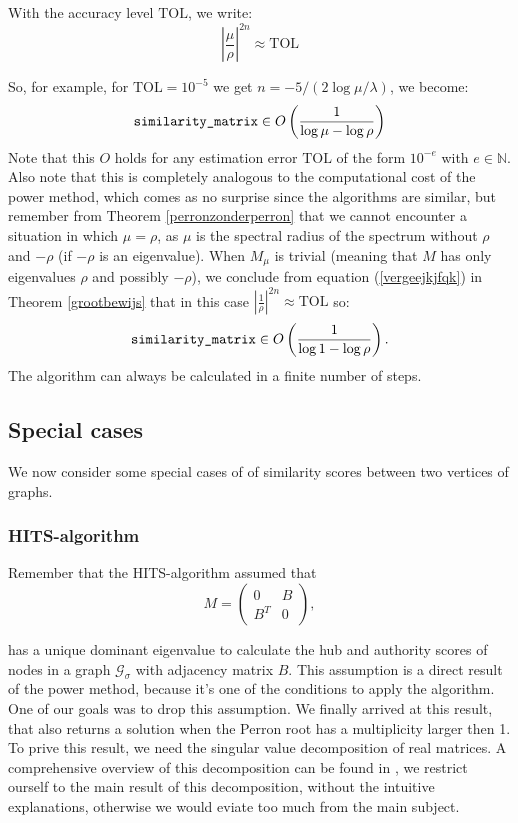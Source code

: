 \documentclass[a4paper,11pt]{report}
\newcommand{\N}{{\mathbb N}}
\newcommand{\graf}{\mathscr{G}}
\newcommand{\tol}{\text{TOL}}
\begin{document}
With the accuracy level $\tol$, we write:
$$\left|\frac{\mu}{\rho} \right|^{2n} \approx \tol$$

So, for example, for $\tol = 10^{-5}$ we get $n = -5/(2\log{\mu/\lambda})$, we become:
$$\text{\texttt{similarity\_matrix}} \in O\left(\frac{1}{\log{\mu- \log\rho}}\right)$$
Note that this $O$ holds for any estimation error $\tol$ of the form $10^{-e}$ with $e \in \N$. 
Also note that this is completely analogous to the computational cost of the 
power method, which comes as no surprise since the algorithms are similar, but remember 
from Theorem \ref{perronzonderperron} that we cannot encounter a situation in 
which $\mu = \rho$, as $\mu$ is the spectral radius
of the spectrum without $\rho$ and $-\rho$ (if $-\rho$ is an eigenvalue). When $M_\mu$ 
is trivial (meaning that $M$ has only eigenvalues $\rho$ and possibly $-\rho$), we conclude from 
equation
(\ref{vergeejkjfqk}) in Theorem \ref{grootbewijs} that in this case $\left|\frac{1}{\rho} \right|^{2n} \approx \tol$ so:
$$\text{\texttt{similarity\_matrix}} \in O\left(\frac{1}{\log{1- \log\rho}}\right).$$
The algorithm can always be calculated in a finite number of steps.
\subsection{Special cases}\label{specialcases}
We now consider some special cases of of similarity scores between two vertices 
of graphs.
\subsubsection{HITS-algorithm}
Remember that the HITS-algorithm assumed that
$$M =  \begin{pmatrix} 
0 & B\\
B^T & 0
\end{pmatrix},$$ 

has a unique dominant eigenvalue to 
calculate the hub and authority scores of nodes in a graph $\graf_\sigma$ with adjacency matrix
$B$. This assumption is a direct result of the power method, because it's one 
of the conditions to apply the algorithm. One of our goals was to drop this 
assumption. We finally arrived at 
this result, that also returns a solution when the Perron root has a 
multiplicity larger then 1. To prive this result, we need the singular value 
decomposition of real matrices. A comprehensive overview of this decomposition 
can be found in \cite{tomasi}, we restrict ourself to the main result of this 
decomposition, without the intuitive explanations, otherwise we would eviate too 
much from the main subject.
\end{document}
